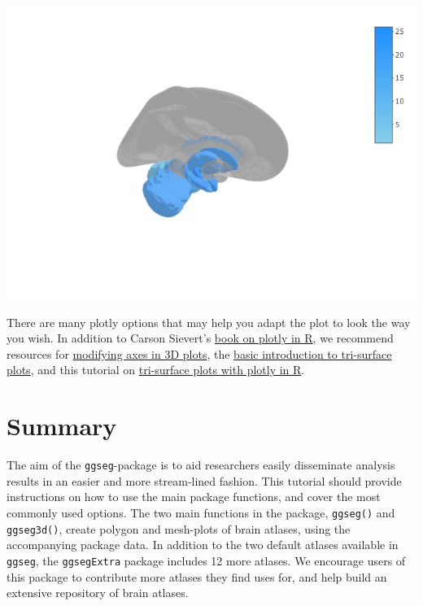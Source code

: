 \documentclass[fleqn,10pt]{wlpeerj} %
\newenvironment{Shaded}{\begin{snugshade}}{\end{snugshade}}
\newcommand{\DataTypeTok}[1]{\textcolor[rgb]{0.13,0.29,0.53}{#1}}
\newcommand{\DecValTok}[1]{\textcolor[rgb]{0.00,0.00,0.81}{#1}}
\newcommand{\FloatTok}[1]{\textcolor[rgb]{0.00,0.00,0.81}{#1}}
\newcommand{\KeywordTok}[1]{\textcolor[rgb]{0.13,0.29,0.53}{\textbf{#1}}}
\newcommand{\NormalTok}[1]{#1}
\newcommand{\OperatorTok}[1]{\textcolor[rgb]{0.81,0.36,0.00}{\textbf{#1}}}
\newcommand{\StringTok}[1]{\textcolor[rgb]{0.31,0.60,0.02}{#1}}
\begin{document}
\begin{Shaded}
\end{Shaded}

\includegraphics[width=0.4\linewidth]{png/ggseg3d_glass}

There are many plotly options that may help you adapt the plot to look the way you wish.
In addition to Carson Sievert's \href{https://plotly-book.cpsievert.me/}{book on plotly in R}, we recommend resources for \href{https://plot.ly/r/axes/\#modifying-axes-for-3D-plots}{modifying axes in 3D plots}, the \href{https://plot.ly/r/trisurf/}{basic introduction to tri-surface plots}, and this tutorial on \href{https://moderndata.plot.ly/trisurf-plots-in-r-using-plotly/}{tri-surface plots with plotly in R}.

\hypertarget{summary}{%
\section{Summary}\label{summary}}

The aim of the \texttt{ggseg}-package is to aid researchers easily disseminate analysis results in an easier and more stream-lined fashion.
This tutorial should provide instructions on how to use the main package functions, and cover the most commonly used options.
The two main functions in the package, \texttt{ggseg()} and \texttt{ggseg3d()}, create polygon and mesh-plots of brain atlases, using the accompanying package data.
In addition to the two default atlases available in \texttt{ggseg}, the \texttt{ggsegExtra} package includes 12 more atlases.
We encourage users of this package to contribute more atlases they find uses for, and help build an extensive repository of brain atlases.
\end{document}
